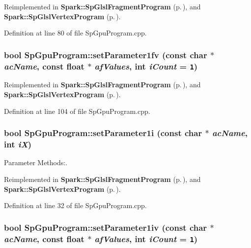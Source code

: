 Reimplemented in {\bf Spark::Sp\-Glsl\-Fragment\-Program} {\rm (p.\,\pageref{classSpark_1_1SpGlslFragmentProgram_a9})}, and {\bf Spark::Sp\-Glsl\-Vertex\-Program} {\rm (p.\,\pageref{classSpark_1_1SpGlslVertexProgram_a9})}.

Definition at line 80 of file Sp\-Gpu\-Program.cpp.
\subsubsection{\setlength{\rightskip}{0pt plus 5cm}bool Sp\-Gpu\-Program::set\-Parameter1fv (const char $\ast$ {\em ac\-Name}, const float $\ast$ {\em af\-Values}, int {\em i\-Count} = {\tt 1})\hspace{0.3cm}{\tt  [virtual]}}\label{classSpark_1_1SpGpuProgram_a24}




Reimplemented in {\bf Spark::Sp\-Glsl\-Fragment\-Program} {\rm (p.\,\pageref{classSpark_1_1SpGlslFragmentProgram_a13})}, and {\bf Spark::Sp\-Glsl\-Vertex\-Program} {\rm (p.\,\pageref{classSpark_1_1SpGlslVertexProgram_a13})}.

Definition at line 104 of file Sp\-Gpu\-Program.cpp.
\subsubsection{\setlength{\rightskip}{0pt plus 5cm}bool Sp\-Gpu\-Program::set\-Parameter1i (const char $\ast$ {\em ac\-Name}, int {\em i\-X})\hspace{0.3cm}{\tt  [virtual]}}\label{classSpark_1_1SpGpuProgram_a12}


Parameter Methods:. 



Reimplemented in {\bf Spark::Sp\-Glsl\-Fragment\-Program} {\rm (p.\,\pageref{classSpark_1_1SpGlslFragmentProgram_a1})}, and {\bf Spark::Sp\-Glsl\-Vertex\-Program} {\rm (p.\,\pageref{classSpark_1_1SpGlslVertexProgram_a1})}.

Definition at line 32 of file Sp\-Gpu\-Program.cpp.
\subsubsection{\setlength{\rightskip}{0pt plus 5cm}bool Sp\-Gpu\-Program::set\-Parameter1iv (const char $\ast$ {\em ac\-Name}, const float $\ast$ {\em af\-Values}, int {\em i\-Count} = {\tt 1})\hspace{0.3cm}{\tt  [virtual]}}\label{classSpark_1_1SpGpuProgram_a16}


